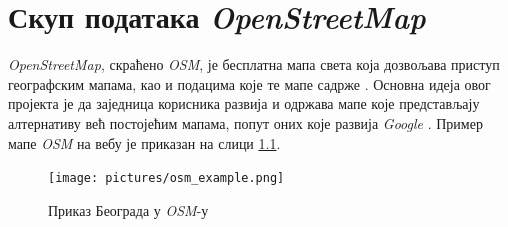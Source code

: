\documentclass[12pt,oneside]{memoir}
\begin{document}
 %

\chapter{Скуп података \textit{OpenStreetMap}}
\label{chp:osm}

\textit{OpenStreetMap}, скраћено \textit{OSM}, је бесплатна мапа света која дозвољава приступ географским мапама, као и подацима које те мапе садрже \cite{osm_wiki}. Основна идеја овог пројекта је да заједница корисника развија и одржава мапе које представљају алтернативу већ постојећим мапама, попут оних које развија \textit{Google} \cite{google_maps}. Пример мапе \textit{OSM} на вебу је приказан на слици \ref{fig:osm_map_example}.

\begin{figure}[!ht]
  \centering
  \texttt{[image: pictures/osm\_example.png]}
  \caption{Приказ Београда у \textit{OSM}-у}
  \label{fig:osm_map_example}
\end{figure}
\end{document}
